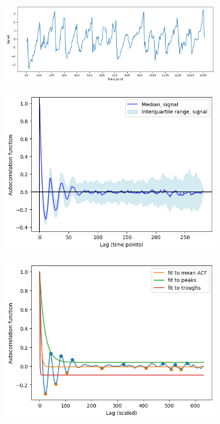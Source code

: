 \begin{figure}
  \centering
  \begin{subfigure}[t]{0.8\textwidth}
  \centering
    \includegraphics[width=\linewidth]{acf_fhn_biol_ts.png}
    \caption{
    }
    \label{fig:acf-fhn-biol-ts}
  \end{subfigure}

  \begin{subfigure}[t]{0.5\textwidth}
  \centering
    \includegraphics[width=\linewidth]{acf_fhn_biol_acf.png}
    \caption{
    }
    \label{fig:acf-fhn-biol-acf}
  \end{subfigure}%
  \begin{subfigure}[t]{0.5\textwidth}
  \centering
    \includegraphics[width=\linewidth]{acf_fhn_biol_acf_fit.png}
    \caption{
    }
    \label{fig:acf-fhn-biol-acf-fit}
  \end{subfigure}


\end{figure}
